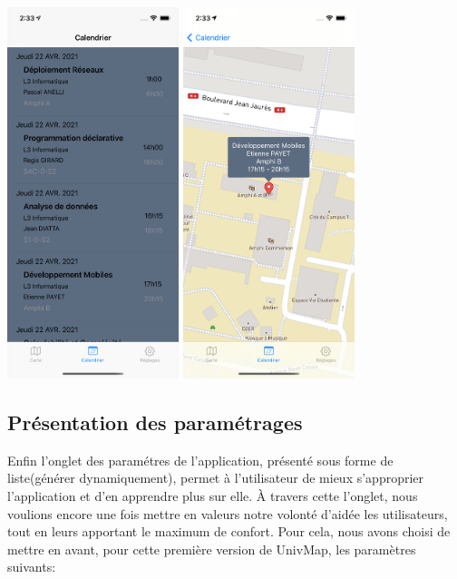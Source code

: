 \documentclass{article}
\begin{document}
\begin{center}
    \includegraphics[width=50mm, scale=0.5]{calendar.png}
    \includegraphics[width=50mm, scale=0.5]{calendar_position.png}
\end{center}



\newpage %



\subsection{Présentation des paramétrages}
Enfin l'onglet des paramétres de l'application, présenté sous forme de liste(générer dynamiquement), permet à l'utilisateur de mieux s'approprier l'application et d'en apprendre plus sur elle. À travers cette l'onglet, nous voulions encore une fois mettre en valeurs notre volonté d'aidée les utilisateurs, tout en leurs apportant le maximum de confort. Pour cela, nous avons choisi de mettre en avant, pour cette première version de UnivMap, les paramètres suivants:
\end{document}
